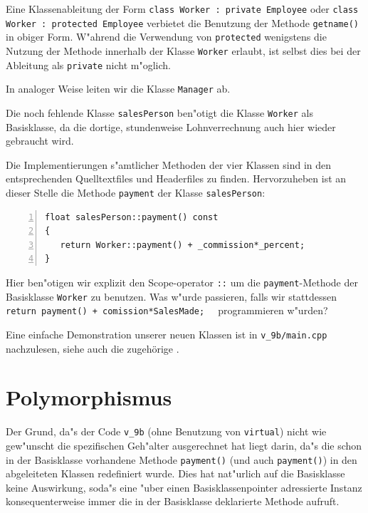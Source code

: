 Eine Klassenableitung der Form \verb|class Worker : private Employee|
oder \verb|class Worker : protected Employee|
verbietet die Benutzung der Methode \verb|getname()| in obiger Form.
W"ahrend die Verwendung von \verb|protected| wenigstens die Nutzung der Methode
innerhalb der Klasse \verb|Worker| erlaubt, ist selbst dies bei
der Ableitung als \verb|private| nicht m"oglich.

In analoger Weise leiten wir die Klasse \verb|Manager| ab.
%

Die noch fehlende Klasse \verb|salesPerson| ben"otigt die Klasse \verb|Worker|
als Basisklasse, da die dortige, stundenweise Lohnverrechnung auch hier wieder gebraucht wird.
%

%
Die Implementierungen s"amtlicher Methoden der vier Klassen sind in den entsprechenden Quelltextfiles und Headerfiles 
zu finden.
Hervorzuheben ist an dieser Stelle die Methode
\verb|payment| der Klasse \verb|salesPerson|:
\begin{lstlisting}[caption={Expliziter Aufruf einer Basisklassenmethode.},label=lst:salesPerson::payment,
basicstyle=\scriptsize,numbers=left, numberstyle=\tiny, stepnumber=2, numbersep=5pt]
float salesPerson::payment() const
{
   return Worker::payment() + _commission*_percent;
}
\end{lstlisting}

Hier ben"otigen wir explizit den Scope-operator \verb|::| um
die \verb|payment|-Methode der Basisklasse \verb|Worker| zu benutzen.
Was w"urde passieren, falls wir  stattdessen
\verb|  return payment() + comission*SalesMade;  | programmieren w"urden?

Eine einfache Demonstration unserer neuen Klassen ist in \texttt{v\_9b/main.cpp} 
nachzulesen, siehe auch die 
zugehörige .
%
%

%
%
\section{Polymorphismus}
\label{sec:A2}
%
Der Grund, da"s der Code \texttt{v\_9b} (ohne Benutzung von \texttt{virtual}) nicht wie gew"unscht die
spezifischen Geh"alter ausgerechnet hat liegt darin, da"s die schon in
der Basisklasse vorhandene Methode \verb|payment()| (und auch \verb|payment()|)
in den abgeleiteten Klassen redefiniert wurde. Dies hat nat"urlich
auf die Basisklasse keine Auswirkung, soda"s eine "uber einen Basisklassenpointer
adressierte Instanz konsequenterweise immer die in der Basisklasse deklarierte Methode
aufruft.

